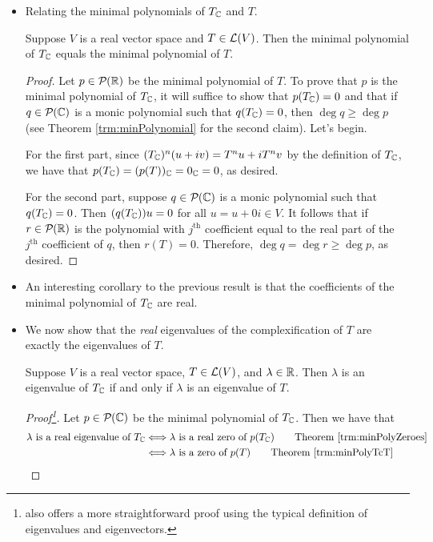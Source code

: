\documentclass[../main.tex]{subfiles}
\begin{document}
\begin{itemize}
    \item Relating the minimal polynomials of $T_{\mathbb{C}}$ and $T$.
    \begin{theorem}\label{trm:minPolyTcT}
        Suppose $V$ is a real vector space and $T\in\mathcal{L}(V)$. Then the minimal polynomial of $T_{\mathbb{C}}$ equals the minimal polynomial of $T$.
        \begin{proof}
            Let $p\in\mathcal{P}_{}(\mathbb{R})$ be the minimal polynomial of $T$. To prove that $p$ is the minimal polynomial of $T_{\mathbb{C}}$, it will suffice to show that $p(T_{\mathbb{C}})=0$ and that if $q\in\mathcal{P}_{}(\mathbb{C})$ is a monic polynomial such that $q(T_{\mathbb{C}})=0$, then $\deg q\geq \deg p$ (see Theorem \ref{trm:minPolynomial} for the second claim). Let's begin.\par
            For the first part, since $(T_{\mathbb{C}})^n(u+iv)=T^nu+iT^nv$ by the definition of $T_{\mathbb{C}}$, we have that $p(T_{\mathbb{C}})=(p(T))_{\mathbb{C}}=0_{\mathbb{C}}=0$, as desired.\par
            For the second part, suppose $q\in\mathcal{P}_{}(\mathbb{C})$ is a monic polynomial such that $q(T_{\mathbb{C}})=0$. Then $(q(T_{\mathbb{C}}))u=0$ for all $u=u+0i\in V$. It follows that if $r\in\mathcal{P}_{}(\mathbb{R})$ is the polynomial with $j^\text{th}$ coefficient equal to the real part of the $j^\text{th}$ coefficient of $q$, then $r(T)=0$. Therefore, $\deg q=\deg r\geq\deg p$, as desired.
        \end{proof}
    \end{theorem}
    \item An interesting corollary to the previous result is that the coefficients of the minimal polynomial of $T_{\mathbb{C}}$ are real.
    \item We now show that the \emph{real} eigenvalues of the complexification of $T$ are exactly the eigenvalues of $T$.
    \begin{theorem}\label{trm:realEigenvalueComplexification}
        Suppose $V$ is a real vector space, $T\in\mathcal{L}(V)$, and $\lambda\in\mathbb{R}$. Then $\lambda$ is an eigenvalue of $T_{\mathbb{C}}$ if and only if $\lambda$ is an eigenvalue of $T$.
        \begin{proof}[Proof\footnote{\textcite{bib:Axler} also offers a more straightforward proof using the typical definition of eigenvalues and eigenvectors.}]
            Let $p\in\mathcal{P}_{}(\mathbb{C})$ be the minimal polynomial of $T_{\mathbb{C}}$.
            Then we have that
            \begin{align*}
                \lambda\text{ is a real eigenvalue of }T_\C &\Longleftrightarrow \lambda\text{ is a real zero of }p(T_\C)\tag*{Theorem \ref{trm:minPolyZeroes}}\\
                &\Longleftrightarrow \lambda\text{ is a zero of }p(T)\tag*{Theorem \ref{trm:minPolyTcT}}\\

\end{align*}
\end{proof}
\end{theorem}
\end{itemize}
\end{document}
